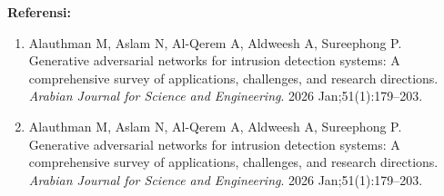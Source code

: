 \documentclass[conference]{IEEEtran}
\begin{document}
\clearpage
\onecolumn %
\pagestyle{empty} %

\begin{landscape}
\vspace*{-1.5cm} %
\begin{table}[p]
\centering
\caption{Ringkasan dan Perbandingan Literatur Survei NIDS dengan Penelitian yang Diusulkan}
\label{tab:literature_review}
\small
\renewcommand{\arraystretch}{1.35} %


\vspace{0.5cm}
\begin{minipage}{0.95\linewidth}
\hspace{0.5cm}\textbf{Referensi:}
\begin{enumerate}
    \item Alauthman M, Aslam N, Al-Qerem A, Aldweesh A, Sureephong P. Generative adversarial networks for intrusion detection systems: A comprehensive survey of applications, challenges, and research directions. \textit{Arabian Journal for Science and Engineering}. 2026 Jan;51(1):179--203.
    \item Alauthman M, Aslam N, Al-Qerem A, Aldweesh A, Sureephong P. Generative adversarial networks for intrusion detection systems: A comprehensive survey of applications, challenges, and research directions. \textit{Arabian Journal for Science and Engineering}. 2026 Jan;51(1):179--203.
\end{enumerate}
\end{minipage}

\end{table}
\end{landscape}

\clearpage
\twocolumn %
\pagestyle{plain}
\end{document}
